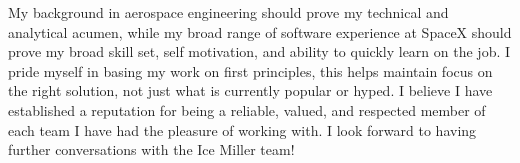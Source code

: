 \begin{cvletter}

My background in aerospace engineering should prove my technical and analytical
acumen, while my broad range of software experience at SpaceX should prove my
broad skill set, self motivation, and ability to quickly learn on the job. I
pride myself in basing my work on first principles, this helps maintain focus on
the right solution, not just what is currently popular or hyped. I believe I
have established a reputation for being a reliable, valued, and respected member
of each team I have had the pleasure of working with. I look forward to having
further conversations with the Ice Miller team!


\end{cvletter}

